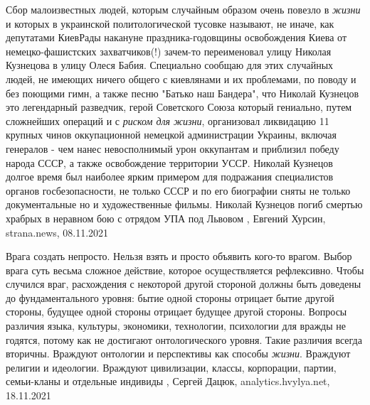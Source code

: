 Сбор малоизвестных людей, которым случайным образом очень повезло в \emph{жизни} и
которых в украинской политологической тусовке называют, не иначе, как
депутатами КиевРады накануне праздника-годовщины освобождения Киева от
немецко-фашистских захватчиков(!) зачем-то переименовал улицу Николая Кузнецова
в улицу Олеся Бабия. Специально сообщаю для этих случайных людей, не имеющих
ничего общего с киевлянами и их проблемами, по поводу и без поющими гимн, а
также песню "Батько наш Бандера", что Николай Кузнецов это легендарный
разведчик, герой Советского Союза который гениально, путем сложнейших операций
и с \emph{риском для жизни}, организовал ликвидацию 11 крупных чинов оккупационной
немецкой администрации Украины, включая генералов - чем нанес невосполнимый
урон оккупантам и приблизил победу народа СССР, а также освобождение
территории УССР. Николай Кузнецов долгое время был наиболее ярким примером для
подражания специалистов органов госбезопасности, не только СССР и по его
биографии сняты не только документальные но и художественные фильмы. Николай
Кузнецов погиб смертью храбрых в неравном бою с отрядом УПА под Львовом
, 
Евгений Хурсин, strana.news, 08.11.2021

Врага создать непросто. Нельзя взять и просто объявить кого-то врагом. Выбор
врага суть весьма сложное действие, которое осуществляется рефлексивно.  Чтобы
случился враг, расхождения с некоторой другой стороной должны быть доведены до
фундаментального уровня: бытие одной стороны отрицает бытие другой стороны,
будущее одной стороны отрицает будущее другой стороны.  Вопросы различия языка,
культуры, экономики, технологии, психологии для вражды не годятся, потому как
не достигают онтологического уровня. Такие различия всегда вторичны.  Враждуют
онтологии и перспективы как способы \emph{жизни}. Враждуют религии и идеологии.
Враждуют цивилизации, классы, корпорации, партии, семьи-кланы и отдельные
индивиды
, Сергей Дацюк, analytics.hvylya.net, 18.11.2021
